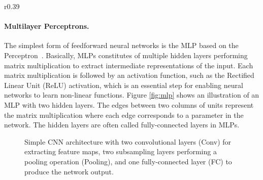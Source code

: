 \vspace{-3mm}
\begin{wrapfigure}{r}{0.39\textwidth}
	\centering
	\vspace{-3mm}
	\resizebox{0.39\textwidth}{!}{
		
	}
	\captionsetup{width=.9\linewidth}
	\caption{Illustration of MLP with two hidden layers.}
	\vspace{-3mm}
	\label{fig:mlp}
\end{wrapfigure}
\paragraph{Multilayer Perceptrons.} The simplest form of feedforward neural networks is the MLP based on the Perceptron~\cite{rosenblatt1958perceptron}. Basically, MLPs constitutes of multiple hidden layers performing matrix multiplication to extract intermediate representations of the input. Each matrix multiplication is followed by an activation function, such as the Rectified Linear Unit (ReLU) activation, which is an essential step for enabling neural networks to learn non-linear functions. Figure \ref{fig:mlp} shows an illustration of an MLP with two hidden layers. The edges between two columns of units represent the matrix multiplication where each edge corresponds to a parameter in the network. The hidden layers are often called fully-connected layers in MLPs. 




\begin{figure}[t]
	\centering
	\resizebox{0.95\textwidth}{!}{
		
	}
	\caption{Simple CNN architecture with two convolutional layers (Conv) for extracting feature maps, two subsampling layers performing a pooling operation (Pooling), and one fully-connected layer (FC) to produce the network output.}
	\label{fig:cnn_simple}
\end{figure}

\vspace{-3mm}
